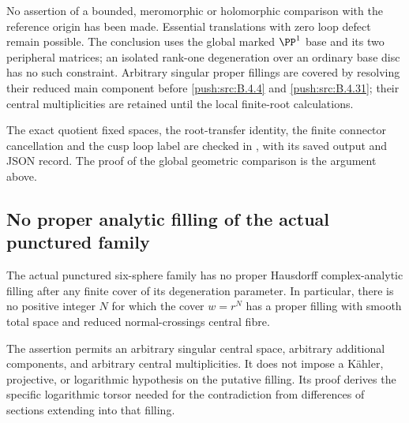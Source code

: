 \begin{remark}
No assertion of a bounded, meromorphic or holomorphic
comparison with the reference origin has been made.
Essential translations with zero loop defect remain
possible. The conclusion uses the global marked
$\PP^1$ base and its two peripheral matrices; an isolated
rank-one degeneration over an ordinary base disc has
no such constraint. Arbitrary singular proper fillings
are covered by resolving their reduced main component
before \ref{push:src:B.4.4} and \ref{push:src:B.4.31}; their central multiplicities
are retained until the local finite-root calculations.
\end{remark}


The exact quotient fixed spaces, the root-transfer identity,
the finite connector cancellation and the cusp loop label
are checked in
, with its saved
output and JSON record. The proof of the global geometric
comparison is the argument above.

\subsection{No proper analytic filling of the actual punctured family}

\begin{theorem}\label{push:src:B.4.33}
\label{push:B433}
The actual punctured six-sphere family has no proper
Hausdorff complex-analytic filling after any finite
cover of its degeneration parameter. In particular,
there is no positive integer $N$ for which the cover
$w=r^N$ has a proper filling with smooth total space
and reduced normal-crossings central fibre.

The assertion permits an arbitrary singular central
space, arbitrary additional components, and arbitrary
central multiplicities. It does not impose a
K\"ahler, projective, or logarithmic hypothesis on
the putative filling. Its proof derives the specific
logarithmic torsor needed for the contradiction from
differences of sections extending into that filling.
\end{theorem}


